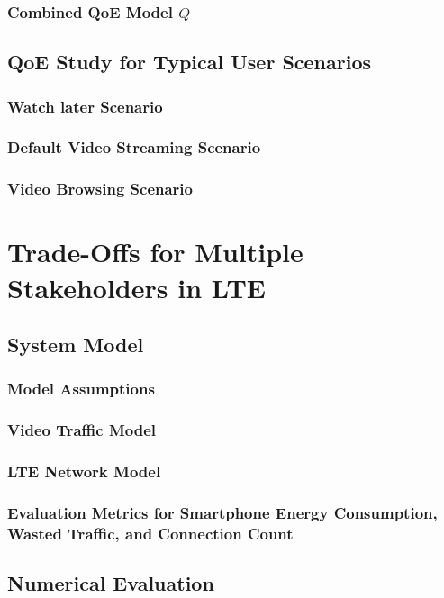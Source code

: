 \subsubsection*{Combined QoE Model $Q$}

\subsection{QoE Study for Typical User Scenarios}
\subsubsection*{Watch later Scenario}
\subsubsection*{Default Video Streaming Scenario}
\subsubsection*{Video Browsing Scenario}

\section{Trade-Offs for Multiple Stakeholders in LTE}
\subsection{System Model}
\subsubsection*{Model Assumptions}
\subsubsection*{Video Traffic Model}
\subsubsection*{LTE Network Model}
\subsubsection*{Evaluation Metrics for Smartphone Energy Consumption, Wasted Traffic, and Connection Count}

\subsection{Numerical Evaluation}
